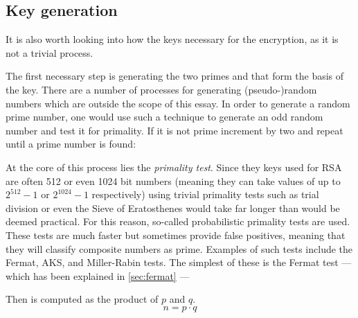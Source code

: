 \documentclass[12pt, titlepage]{article}
\begin{document}
\subsection{Key generation}

It is also worth looking into how the keys necessary for the encryption, as it is not a
trivial process.

The first necessary step is generating the two primes  and  that form the
basis of the key. There are a number of processes for generating (pseudo-)random numbers
which are outside the scope of this essay. In order to generate a random prime number, one
would use such a technique to generate an odd random number and test it for primality.  If
it is not prime increment by two and repeat until a prime number is found:
%
\begin{figure}[H]
\end{figure}
%
At the core of this process lies the \emph{primality test}. Since they keys used for RSA are
often 512 or even 1024 bit numbers (meaning they can take values of up to $2^{512} - 1$ or
$2^{1024} - 1$ respectively) using trivial primality tests such as trial division or even
the Sieve of Eratosthenes would take far longer than would be deemed practical.  For this
reason, so-called probabilistic primality tests are used. These tests are much faster but
sometimes provide false positives, meaning that they will classify composite numbers as
prime. Examples of such tests include the Fermat, AKS, and Miller-Rabin tests. The simplest
of these is the Fermat test --- which has been explained in \autoref{sec:fermat} --- 

Then  is computed as the product of $p$ and $q$. $$n=p \cdot q$$
\end{document}
